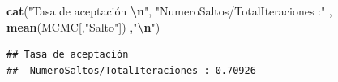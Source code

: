 \documentclass[
]{article}
\newenvironment{Shaded}{\begin{snugshade}}{\end{snugshade}}
\newcommand{\FunctionTok}[1]{\textcolor[rgb]{0.13,0.29,0.53}{\textbf{#1}}}
\newcommand{\NormalTok}[1]{#1}
\newcommand{\SpecialCharTok}[1]{\textcolor[rgb]{0.81,0.36,0.00}{\textbf{#1}}}
\newcommand{\StringTok}[1]{\textcolor[rgb]{0.31,0.60,0.02}{#1}}
\begin{document}
\begin{Shaded}
\begin{Highlighting}[]
\FunctionTok{cat}\NormalTok{(}\StringTok{"Tasa de aceptación }\SpecialCharTok{\textbackslash{}n}\StringTok{"}\NormalTok{,}
    \StringTok{"NumeroSaltos/TotalIteraciones :"}\NormalTok{ , }\FunctionTok{mean}\NormalTok{(MCMC[,}\StringTok{"Salto"}\NormalTok{]) ,}\StringTok{"}\SpecialCharTok{\textbackslash{}n}\StringTok{"}\NormalTok{)}
\end{Highlighting}
\end{Shaded}

\begin{verbatim}
## Tasa de aceptación 
##  NumeroSaltos/TotalIteraciones : 0.70926
\end{verbatim}
\end{document}
